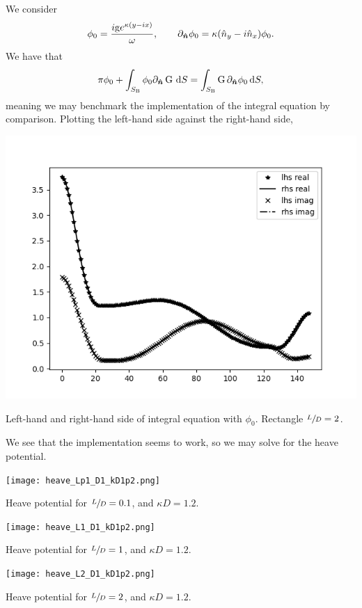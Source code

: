 We consider
\[
    \phi_0 = \frac{i \mathrm{g} e^{\kappa(y-ix)}}{\omega}, \qquad \partial_{\bm{\hat{n}}}\phi_0 = \kappa ( \hat{n}_y - i \hat{n}_x ) \phi_0.
\]
We have that
\[
    \pi \phi_0 + \int_{S_{\mathrm{B}}} \phi_0 \partial_{\bm{\hat{n}}} \operatorname{G} \,\mathrm{d} S = \int_{S_{\mathrm{B}}} \operatorname{G} \partial_{\bm{\hat{n}}} \phi_0 \,\mathrm{d} S,
\]
meaning we may benchmark the implementation of the integral equation by comparison.
Plotting the left-hand side against the right-hand side,
\begin{Figure}
    \centering
    \captionsetup{type = figure}
    \includegraphics[width = \textwidth]{phi0_L2_D1_kD1point2.png}
    \caption{Left-hand and right-hand side of integral equation with $\phi_0$. Rectangle $\sfrac{L}{D} = 2$.}
\end{Figure}
\noindent We see that the implementation seems to work, so we may solve for the heave potential.
\begin{Figure}
    \centering
    \captionsetup{type = figure}
    \texttt{[image: heave\_Lp1\_D1\_kD1p2.png]}
    \caption{Heave potential for $\sfrac{L}{D} = 0.1$, and $\kappa D = 1.2$.}
\end{Figure}
\begin{Figure}
    \centering
    \captionsetup{type = figure}
    \texttt{[image: heave\_L1\_D1\_kD1p2.png]}
    \caption{Heave potential for $\sfrac{L}{D} = 1$, and $\kappa D = 1.2$.}
\end{Figure}
\begin{Figure}
    \centering
    \captionsetup{type = figure}
    \texttt{[image: heave\_L2\_D1\_kD1p2.png]}
    \caption{Heave potential for $\sfrac{L}{D} = 2$, and $\kappa D = 1.2$.}
\end{Figure}
